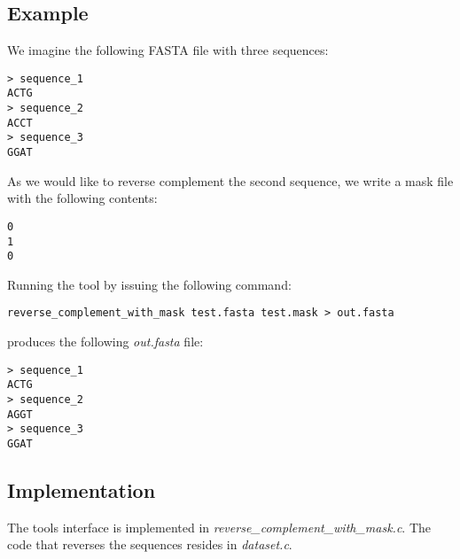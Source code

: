 \subsection{Example}
We imagine the following FASTA file with three sequences:
\begin{lstlisting}
> sequence_1
ACTG
> sequence_2
ACCT
> sequence_3
GGAT
\end{lstlisting}
As we would like to reverse complement the second sequence, we write
a mask file with the following contents:
\begin{lstlisting}
0
1
0
\end{lstlisting}
Running the tool by issuing the following command:
\begin{lstlisting}
reverse_complement_with_mask test.fasta test.mask > out.fasta
\end{lstlisting}
produces the following \emph{out.fasta} file:
\begin{lstlisting}
> sequence_1
ACTG
> sequence_2
AGGT
> sequence_3
GGAT
\end{lstlisting}

\subsection{Implementation}
The tools interface is implemented in \emph{reverse\_complement\_with\_mask.c}.
The code that reverses the sequences resides in \emph{dataset.c}.
